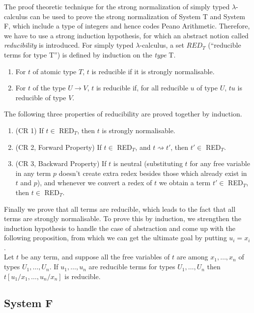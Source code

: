 \documentclass{llncs}
\begin{document}
The proof theoretic technique for the strong normalization of simply typed 
$\lambda$-calculus can be used to prove the strong normalization 
of System T and System F, which
include a type of integers and hence codes Peano Arithmetic. Therefore, we have
to use a strong induction hypothesis, for which an abstract notion called
\emph{reducibility} is introduced. For simply typed $\lambda$-calculus, a set
$RED_T$ (``reducible terms for type T'') is defined by induction on the
\emph{type} T.
\begin{enumerate}
\item For $t$ of atomic type $T$, $t$ is reducible if it is strongly
normalisable.
\item For $t$ of the type $U \rightarrow V$, $t$ is reducible if, for all
reducible $u$ of type $U$, $t u$ is reducible of type $V$.
\end{enumerate}

The following three properties of reducibility are proved together by induction.
\begin{enumerate}
\item (CR 1) If $t \in$ RED$_T$, then $t$ is strongly normalisable.

\item (CR 2, Forward Property) If $t \in$ RED$_T$, and $t \rightsquigarrow t'$, then $t' \in$
RED$_T$.

\item (CR 3, Backward Property) If $t$ is neutral (substituting $t$ for any
free variable in any term $p$ doesn't create extra redex besides those which already
exist in $t$ and $p$), and whenever we convert a redex of $t$ we obtain a term
$t' \in$ RED$_T$, then $t \in$ RED$_T$.

\end{enumerate}

Finally we prove that all terms are reducible, which leads to the fact that all
terms are strongly normalisable. To prove this by induction, we strengthen the
induction hypothesis to handle the case of abstraction and come up with the
following proposition, from which we can get the ultimate goal by putting $u_i =
x_i$.\\
Let $t$ be any term, and suppose all the free variables of $t$ are among $x_1,
\dots,x_n$ of types $U_1, \dots, U_n$. If $u_1, \dots, u_n$ are reducible terms
for types $U_1, \dots, U_n$ then $t[u_1/x_1, \dots, u_n/x_n]$ is reducible.


\subsection{System F}
\end{document}
